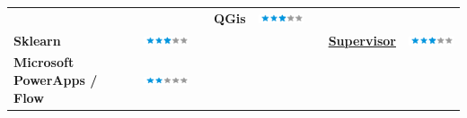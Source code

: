 \documentclass[]{friggeri-cv}
\begin{document}
\begin{table}[!h]
\begin{tabular}{L{3.25cm}cL{2cm}L{2.25cm}cL{2cm}L{2.25cm}c}
		& 
		&&
		\textbf{QGis} & \includegraphics[scale=0.40]{img/3stars.png} \\
		\textbf{Sklearn}&
		\includegraphics[scale=0.40]{img/3stars.png} &&
		&
		&&
		\href{https://snowdengroup.com/software/supervisor/}{\textbf{Supervisor}}&
		\includegraphics[scale=0.40]{img/3stars.png}\\
		\textbf{Microsoft PowerApps / Flow}&
		\includegraphics[scale=0.40]{img/2stars.png}&&
		&
		&&
		&
	\end{tabular}
\end{table}
\end{document}

